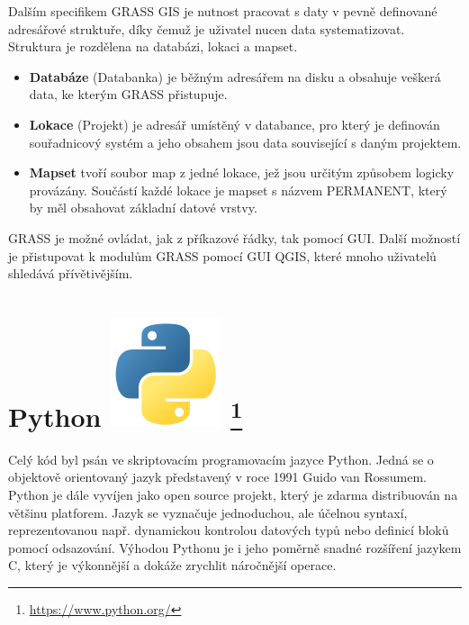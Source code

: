 Dalším specifikem GRASS GIS je nutnost pracovat s daty v pevně
definované adresářové struktuře, díky čemuž je uživatel nucen data
systematizovat. Struktura je rozdělena na databázi, lokaci a mapset.
\begin{itemize}
	\item \textbf{Databáze} (Databanka) je běžným adresářem na disku a 
	obsahuje veškerá data, ke kterým GRASS přistupuje.
	\item \textbf{Lokace} (Projekt) je adresář umístěný v databance, 
	pro který je definován souřadnicový systém a jeho obsahem jsou data 
	související s daným projektem.
	\item \textbf{Mapset} tvoří soubor map z jedné lokace, jež jsou 
	určitým způsobem logicky provázány. Součástí každé lokace je mapset 
	s názvem PERMANENT, který by měl obsahovat základní datové vrstvy.
\end{itemize}
GRASS je možné ovládat, jak z příkazové řádky, tak pomocí GUI. Další
možností je přistupovat k modulům GRASS pomocí GUI QGIS, které mnoho
uživatelů shledává přívětivějším.\cite{grass}

\newpage
\section[Python]{Python \includegraphics[scale=0.2]{./pictures/python.png}
\footnote{\url{https://www.python.org/}}}
\label{python}
Celý kód byl psán ve skriptovacím programovacím jazyce Python. Jedná
se o objektově orientovaný jazyk představený v roce 1991 Guido van
Rossumem. Python je dále vyvíjen jako open source projekt, který je
zdarma distribuován na většinu platforem. Jazyk se vyznačuje
jednoduchou, ale účelnou syntaxí, reprezentovanou např. dynamickou
kontrolou datových typů nebo definicí bloků pomocí odsazování. Výhodou
Pythonu je i jeho poměrně snadné rozšíření jazykem C, který je
výkonnější a dokáže zrychlit náročnější operace.

